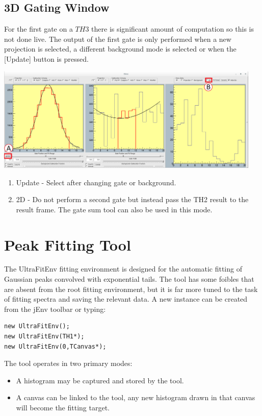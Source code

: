 \documentclass[a4paper,10pt]{article}
\begin{document}
\subsection{3D Gating Window}
For the first gate on a $TH3$ there is significant amount of computation so this is not done live. The output of the first gate is only performed when a new projection is selected, a different background mode is selected or when the [Update] button is pressed.
\begin{center}
\includegraphics[width=0.95\textwidth]{jGateA.png}
\begin{enumerate}
\item Update - Select after changing gate or background.
\item 2D - Do not perform a second gate but instead pass the TH2 result to the result frame. The gate sum tool can also be used in this mode.
\end{enumerate}
\end{center}


\section{Peak Fitting Tool}\label{sec:peakfit}
The UltraFitEnv fitting environment is designed for the automatic fitting of Gaussian peaks convolved with exponential tails.
The tool has some foibles that are absent from the root fitting environment, but it is far more tuned to the task of fitting spectra and saving the relevant data.
A new instance can be created from the jEnv toolbar or typing:
\lstset{language=C++}
\begin{lstlisting}
new UltraFitEnv();
new UltraFitEnv(TH1*);
new UltraFitEnv(0,TCanvas*);
\end{lstlisting}
The tool operates in two primary modes:
\begin{itemize}
\item A histogram may be captured and stored by the tool.
\item A canvas can be linked to the tool, any new histogram drawn in that canvas will become the fitting target.
\end{itemize}
\end{document}
